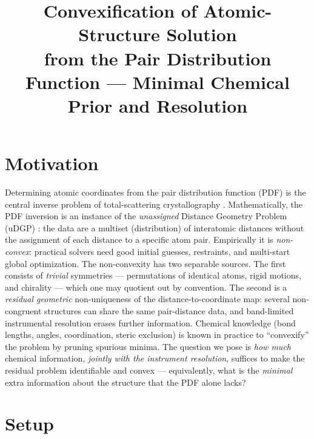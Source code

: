 \documentclass[11pt]{article}
\title{Convexification of Atomic-Structure Solution \\
from the Pair Distribution Function --- Minimal Chemical Prior and Resolution}
\author{}
\date{}
\begin{document}
\maketitle

\section*{Motivation}

Determining atomic coordinates from the pair distribution function (PDF) is the
central inverse problem of total-scattering crystallography
\cite{Billinge2004}. Mathematically, the PDF inversion is an instance of the
\emph{unassigned} Distance Geometry Problem (uDGP) \cite{Billinge2018}: the
data are a multiset (distribution) of interatomic distances without the
assignment of each distance to a specific atom pair. Empirically it is \emph{non-convex}: practical solvers
need good initial guesses, restraints, and multi-start global optimization.
The non-convexity has two separable sources. The first consists of
\emph{trivial} symmetries --- permutations of identical atoms, rigid motions,
and chirality --- which one may quotient out by convention. The second is a
\emph{residual geometric} non-uniqueness of the distance-to-coordinate map:
several non-congruent structures can share the same pair-distance data, and
band-limited instrumental resolution erases further information. Chemical
knowledge (bond lengths, angles, coordination, steric exclusion) is known in
practice to ``convexify'' the problem by pruning spurious minima. The
question we pose is \emph{how much} chemical information, \emph{jointly with
the instrument resolution}, suffices to make the residual problem
identifiable and convex --- equivalently, what is the \emph{minimal} extra
information about the structure that the PDF alone lacks?

\section*{Setup}
\end{document}
